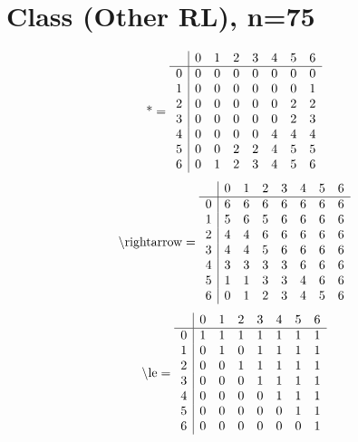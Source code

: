 \documentclass[11pt]{article}
\begin{document}
\section{Class (Other RL), n=75}
\[\text{*} = 
\begin{array}{r | r r r r r r r}
 & 0 & 1 & 2 & 3 & 4 & 5 & 6 \\ \hline
0 & 0 & 0 & 0 & 0 & 0 & 0 & 0 \\
1 & 0 & 0 & 0 & 0 & 0 & 0 & 1 \\
2 & 0 & 0 & 0 & 0 & 0 & 2 & 2 \\
3 & 0 & 0 & 0 & 0 & 0 & 2 & 3 \\
4 & 0 & 0 & 0 & 0 & 4 & 4 & 4 \\
5 & 0 & 0 & 2 & 2 & 4 & 5 & 5 \\
6 & 0 & 1 & 2 & 3 & 4 & 5 & 6 \\
\end{array}
\]
\[\text{\textbackslash rightarrow} = 
\begin{array}{r | r r r r r r r}
 & 0 & 1 & 2 & 3 & 4 & 5 & 6 \\ \hline
0 & 6 & 6 & 6 & 6 & 6 & 6 & 6 \\
1 & 5 & 6 & 5 & 6 & 6 & 6 & 6 \\
2 & 4 & 4 & 6 & 6 & 6 & 6 & 6 \\
3 & 4 & 4 & 5 & 6 & 6 & 6 & 6 \\
4 & 3 & 3 & 3 & 3 & 6 & 6 & 6 \\
5 & 1 & 1 & 3 & 3 & 4 & 6 & 6 \\
6 & 0 & 1 & 2 & 3 & 4 & 5 & 6 \\
\end{array}
\]
\[\text{\textbackslash le} = 
\begin{array}{r | r r r r r r r}
 & 0 & 1 & 2 & 3 & 4 & 5 & 6 \\ \hline
0 & 1 & 1 & 1 & 1 & 1 & 1 & 1 \\
1 & 0 & 1 & 0 & 1 & 1 & 1 & 1 \\
2 & 0 & 0 & 1 & 1 & 1 & 1 & 1 \\
3 & 0 & 0 & 0 & 1 & 1 & 1 & 1 \\
4 & 0 & 0 & 0 & 0 & 1 & 1 & 1 \\
5 & 0 & 0 & 0 & 0 & 0 & 1 & 1 \\
6 & 0 & 0 & 0 & 0 & 0 & 0 & 1 \\
\end{array}
\]
\end{document}

